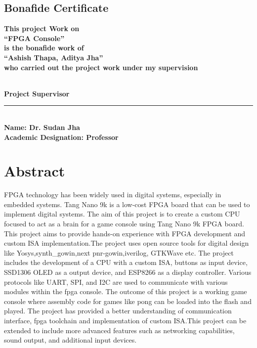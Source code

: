\documentclass[a4paper,12pt]{article}
\begin{document}
    \newpage
    \vspace*{2cm}
    \begin{center}
    \section*{Bonafide Certificate}
    \vspace{2cm}
    \textbf{\large This project Work on} \\[0.2cm]
    \textbf{\large “FPGA Console”} \\[0.2cm]
    \textbf{\large is the bonafide work of} \\[0.2cm]
    \textbf{\large “Ashish Thapa, Aditya Jha”} \\[0.2cm]
    \textbf{\large who carried out the project work under my supervision} \\[0.2cm]
    \end{center}

    \vspace{3cm}
    \phantom{} \\[0.2cm]
    \textbf{\large Project Supervisor}
    \phantom{} \\[0.2cm]
    \rule{6cm}{0.1pt} \\[0.2cm]
    \textbf{\large Name: Dr. Sudan Jha} \\[0.2cm]
    \textbf{\large Academic Designation: Professor}

    \newpage
    \section*{Abstract}


    FPGA technology has been widely used in digital systems, especially in embedded systems. Tang Nano 9k is a low-cost FPGA board that can be used to implement digital systems. The aim of this project is to create a custom CPU focused to act as a brain for a game console using Tang Nano 9k FPGA board. This project aims to provide hands-on experience with FPGA development and custom ISA implementation.The project uses open source tools for digital design like Yosys,synth\_gowin,next pnr-gowin,iverilog, GTKWave etc. The project includes the development of a CPU with a custom ISA, buttons as  input device, SSD1306 OLED as a output device, and ESP8266 as a display controller. Various protocols like UART, SPI, and I2C are used to communicate with various modules within the fpga console. The outcome of this project is a working game console where assembly code for games like pong can be loaded into the flash and played. The project has provided a better understanding of communication interface, fpga toolchain and implementation of custom ISA.This project can be extended to include more advanced features such as networking capabilities, sound output, and additional input devices. 
    \vspace{0.5cm}
\end{document}
